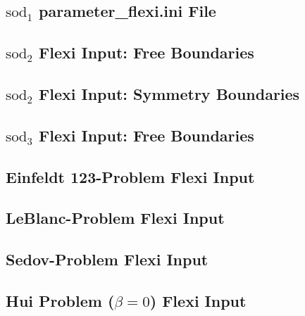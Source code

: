 \begin{appendices}
\subsection{$\mathrm{sod}_1$ parameter\_flexi.ini File}\label{ssec:flexiin-sod1}


\subsection{$\mathrm{sod}_2$ Flexi Input: Free Boundaries}\label{ssec:flexiin-sod2-BC2}


\subsection{$\mathrm{sod}_2$ Flexi Input: Symmetry Boundaries}\label{ssec:flexiin-sod2-BC9}


\subsection{$\mathrm{sod}_3$ Flexi Input: Free Boundaries}\label{ssec:flexiin-sod3-BC9}


\subsection{Einfeldt 123-Problem Flexi Input}\label{ssec:flexiin-einfeldt}


\subsection{LeBlanc-Problem Flexi Input}\label{ssec:flexiin-leblanc}


\subsection{Sedov-Problem Flexi Input}\label{ssec:flexiin-sedov}


\subsection{Hui Problem ($\beta = 0$) Flexi Input}\label{ssec:flexiin-hui-Rot0}



\end{appendices}
